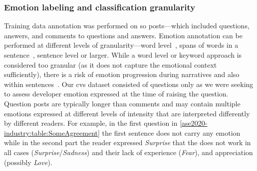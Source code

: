 \subsubsection{Emotion labeling and classification granularity}
Training data annotation was performed on \gls{so} posts---which included questions, answers, and comments to questions and answers.
Emotion annotation can be performed at different levels of granularity---word level~\citep{StrapparavaWordNet-Affect:WordNet}, spans of words in a sentence~\citep{Aman2007IdentifyingText}, sentence level or larger.  While a word level or keyword approach is considered too granular (as it does not capture the emotional context sufficiently), there is a risk of emotion progression during narratives and also within sentences~\citep{Aman2007IdentifyingText, murgia2014}.  Our \gls{cvs} dataset consisted of questions only as we were seeking to assess developer emotion expressed at the time of raising the question.  Question posts are typically longer than comments and may contain multiple emotions expressed at different levels of intensity that are interpreted differently by different readers.  For example, in the first question in \cref{ase2020-industry:table:SomeAgreement} the first sentence does not carry any emotion while in the second part the reader expressed \textit{Surprise} that the  does not work in all cases (\textit{Surprise}/\textit{Sadness}) and their lack of experience (\textit{Fear}), and appreciation (possibly \textit{Love}).   

